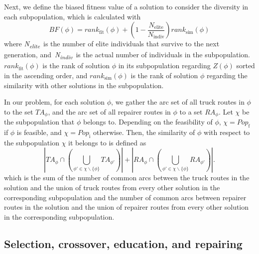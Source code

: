 Next, we define the biased fitness value of a solution to consider the diversity in each
subpopulation, which is calculated
with\begin{equation}
\label{ch4:eq:71}
BF(\phi) = rank_{\text{fit}}(\phi) + \left( {1 - \frac{N_{\text{elite}}}{N_{\text{indiv}}}} \right)rank_{\text{sim}}(\phi)
\end{equation}where
\emph{N\textsubscript{elite}}~is the number of elite individuals that survive to the next
generation, and~\emph{N\textsubscript{indiv}}~is the actual number of individuals in the
subpopulation. \(\mathit{ran}k_{\text{fit}}(\phi)\) is the rank of solution \(\phi\) in its
subpopulation regarding \(Z(\phi)\) sorted in the ascending order, and
\(\mathit{ran}k_{\text{sim}}(\phi)\) is the rank of solution \(\phi\) regarding the similarity with
other solutions in the subpopulation.

In our problem, for each solution \(\phi\), we gather the arc set of all truck routes in \(\phi\) to
the set \(TA_{\phi}\), and the arc set of all repairer routes in \(\phi\) to a set \(RA_{\phi}\).
Let \(\chi\) be the subpopulation that \(\phi\) belongs to. Depending on the feasibility of
\(\phi\), \(\chi = Pop_{\text{f}}\) if \(\phi\) is feasible, and \(\chi = Pop_{\text{i}}\)
otherwise. Then, the similarity of \(\phi\) with respect to the subpopulation \(\chi\) it belongs to
is defined
as\begin{equation}
\label{ch4:eq:72}
\left| {TA_{\phi} \cap \left( {\bigcup\limits_{\phi' \in \chi \smallsetminus {\{\phi\}}}{TA_{\phi'}}} \right)} \right| + \left| {RA_{\phi} \cap \left( {\bigcup\limits_{\phi' \in \chi \smallsetminus {\{\phi\}}}{RA_{\phi'}}} \right)} \right|.
\end{equation}which
is the sum of the number of common arcs between the truck routes in the solution and the union of
truck routes from every other solution in the corresponding subpopulation and the number of common
arcs between repairer routes in the solution and the union of repairer routes from every other
solution in the corresponding subpopulation.

\subsection{Selection, crossover, education, and repairing}\label{ch4:subsec:selection-crossover-education-repairing}

